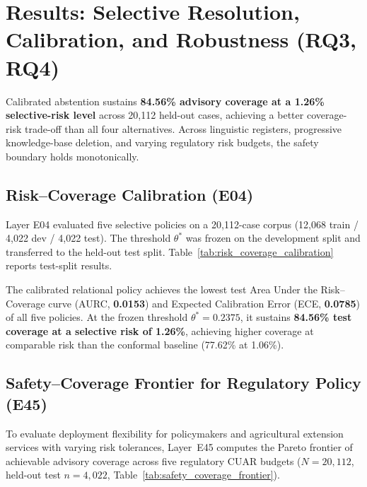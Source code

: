 
\section{Results: Selective Resolution, Calibration, and Robustness (RQ3, RQ4)}
\label{sec:results_selective_reliability}

Calibrated abstention sustains \textbf{84.56\% advisory coverage at a 1.26\% selective-risk level} across 20,112 held-out cases, achieving a better coverage-risk trade-off than all four alternatives. Across linguistic registers, progressive knowledge-base deletion, and varying regulatory risk budgets, the safety boundary holds monotonically.

\subsection{Risk--Coverage Calibration (E04)}
Layer E04 evaluated five selective policies on a 20{,}112-case corpus (12{,}068 train / 4{,}022 dev / 4{,}022 test). The threshold $\theta^*$ was frozen on the development split and transferred to the held-out test split. Table~\ref{tab:risk_coverage_calibration} reports test-split results.



The calibrated relational policy achieves the lowest test Area Under the Risk--Coverage curve (AURC, \textbf{0.0153}) and Expected Calibration Error (ECE, \textbf{0.0785}) of all five policies. At the frozen threshold $\theta^* = 0.2375$, it sustains \textbf{84.56\% test coverage at a selective risk of 1.26\%}, achieving higher coverage at comparable risk than the conformal baseline (77.62\% at 1.06\%).

\subsection{Safety--Coverage Frontier for Regulatory Policy (E45)}
To evaluate deployment flexibility for policymakers and agricultural extension services with varying risk tolerances, Layer~E45 computes the Pareto frontier of achievable advisory coverage across five regulatory CUAR budgets ($N=20{,}112$, held-out test $n=4{,}022$, Table~\ref{tab:safety_coverage_frontier}).



